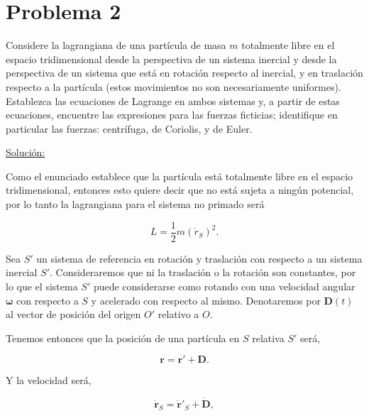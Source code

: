 \documentclass[a4paper,10pt]{article}
\numberwithin{equation}{section}
\begin{document}
\section{Problema 2}

Considere la lagrangiana de una partícula de masa $m$ totalmente libre en el 
espacio tridimensional desde la perspectiva de un sistema inercial y desde la 
perspectiva de un sistema que está en rotación respecto al inercial, y en 
traslación respecto a la partícula (estos movimientos no son necesariamente uniformes). 
Establezca las ecuaciones de Lagrange en ambos sistemas y, a partir de estas ecuaciones, 
encuentre las expresiones para las fuerzas ficticias; identifique en particular 
las fuerzas: centrífuga, de Coriolis, y de Euler.

\vspace{.3cm}

\underline{Solución:} \vspace{.3cm}

Como el enunciado establece que la partícula está totalmente libre en el espacio
tridimensional, entonces esto quiere decir que no está sujeta a ningún potencial, 
por lo tanto la lagrangiana para el sistema no primado será

\begin{equation}
 L = \frac{1}{2}m (\dot{r}_{S})^2.
 \label{eq:lagrangianaEnS}
\end{equation}

Sea $S'$ un sistema de referencia en rotación y traslación con respecto a un sistema inercial 
$S'$. Consideraremos que ni la traslación o la rotación son constantes, por lo que el sistema 
$S'$ puede considerarse como rotando con una velocidad angular $\mathbf{\omega}$ con respecto a
$S$ y acelerado con respecto al mismo. Denotaremos por $\mathbf{D}(t)$ al vector 
de posición del origen $O'$ relativo a $O$.

\vspace{.3cm}

Tenemos entonces que la posición de una partícula en $S$ relativa $S'$ será,

\begin{equation}
 \mathbf{r = r' + D}.
\end{equation}

Y la velocidad será,

\begin{equation}
 \mathbf{\dot{r}}_S = \mathbf{\dot{r}}'_S + \mathbf{\dot{D}},
\end{equation}
\end{document}
